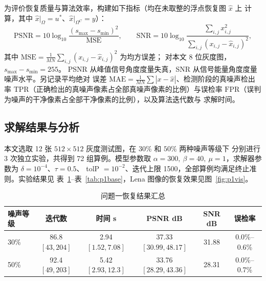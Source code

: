 \documentclass[withoutpreface,bwprint]{cumcmthesis}
\begin{document}
为评价恢复质量与算法效率，构建如下指标（均在未取整的浮点恢复图 $\hat x$ 上
计算，其中 $\hat x|_{\Omega}=u^{*}$、$\hat x|_{\Omega^{C}}=y$）：
\begin{equation}
  \mathrm{PSNR}=10\log_{10}\frac{(s_{\max}-s_{\min})^{2}}{\mathrm{MSE}},
  \qquad
  \mathrm{SNR}=10\log_{10}\frac{\sum_{i,j}x_{i,j}^{2}}
  {\sum_{i,j}(x_{i,j}-\hat x_{i,j})^{2}},
\end{equation}
其中 $\mathrm{MSE}=\frac{1}{MN}\sum_{i,j}(x_{i,j}-\hat x_{i,j})^{2}$ 为均方误差；
对本文 8 位灰度图，$s_{\max}-s_{\min}=255$。
PSNR 从峰值信号角度度量失真，SNR 从信号能量角度度量噪声水平。另记录平均绝对
误差 $\mathrm{MAE}=\frac{1}{MN}\sum|x-\hat x|$、检测阶段的真噪声检出率
$\mathrm{TPR}$（正确检出的真噪声像素占全部真噪声像素的比例）与误检率
$\mathrm{FPR}$（误判为噪声的干净像素占全部干净像素的比例），以及算法迭代数与
求解时间。

\subsection{求解结果与分析}

本文选取 12 张 $512\times512$ 灰度测试图，在 $30\%$ 和 $50\%$ 两种噪声等级下
分别进行 3 次独立实验，共得到 72 组算例。模型参数取
$\alpha=300,\ \beta=40,\ \mu=1$，求解器参数为 $\delta=10^{-4}$、$\tau=0.5$、
tolP $=10^{-2}$、迭代上限 1500，全部算例均满足终止准则。实验结果见
表~\ref{tab:p1sum}--表~\ref{tab:p1base}，Lena 图像的恢复效果见图~\ref{fig:p1vis}。

\begin{table}[!htbp]
  \centering\small
  \caption{问题一恢复结果汇总}
  \label{tab:p1sum}
  \begin{tabular}{lccccc}
    \toprule[1.5pt]
    噪声等级 & 迭代数 & 时间 s & PSNR dB & SNR dB & 误检率 \\
    \midrule[1pt]
    30\% & 86.8 $[43,204]$ & 2.94 $[1.52,7.08]$ & 37.33 $[30.99,48.17]$ & 31.88 & 0.0\%--0.6\% \\
    50\% & 92.4 $[49,203]$ & 5.42 $[2.93,12.3]$ & 33.76 $[28.29,43.36]$ & 28.31 & 0.0\%--0.7\% \\
    \bottomrule[1.5pt]
  \end{tabular}
\end{table}
\end{document}
